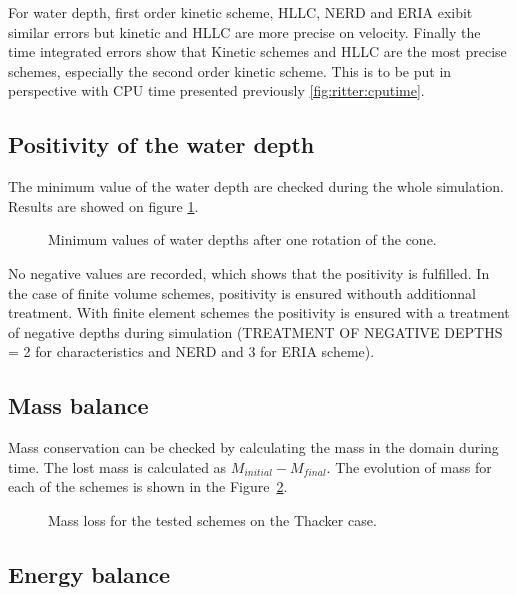 For water depth, first order kinetic scheme, HLLC, NERD and ERIA exibit similar errors but kinetic and HLLC are more precise on velocity.
Finally the time integrated errors show that Kinetic schemes and HLLC are the most precise schemes, especially the second order kinetic scheme.
This is to be put in perspective with CPU time presented previously \ref{fig:ritter:cputime}.

\subsection{Positivity of the water depth}

The minimum value of the water depth are checked during the whole simulation. 
Results are showed on figure \ref{t2d:ritter:minmax}.

\begin{figure}[H]
\centering
{}
\caption{Minimum values of water depths after one rotation of the cone.}
\label{t2d:ritter:minmax}
\end{figure}

No negative values are recorded, which shows that the positivity is fulfilled.
In the case of finite volume schemes, positivity is ensured withouth additionnal treatment.
With finite element schemes the positivity is ensured with a treatment of negative depths
during simulation (TREATMENT OF NEGATIVE DEPTHS = 2 for characteristics and NERD and 3 for ERIA scheme).

\subsection{Mass balance}

Mass conservation can be checked by calculating the mass in the domain during time.
The lost mass is calculated as $M_{initial} - M_{final}$.
The evolution of mass for each of the schemes is shown in the Figure~\ref{fig:ritter:VoLTime}.

\begin{figure}[H]
\centering
  \caption{Mass loss for the tested schemes on the Thacker case.}
\label{fig:ritter:VoLTime}
\end{figure}

\subsection{Energy balance}

